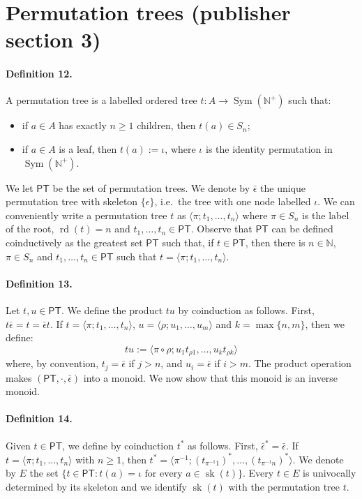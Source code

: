 \section*{Permutation trees (publisher section 3)}
\paragraph{Definition 12.} A permutation tree is a labelled ordered tree $t:A\to\operatorname{Sym}(\mathbb N^+)$ such that:
\begin{itemize}
\item if $a\in A$ has exactly $n\ge1$ children, then $t(a)\in S_n$;
\item if $a\in A$ is a leaf, then $t(a):=\iota$, where $\iota$ is the identity permutation in $\operatorname{Sym}(\mathbb N^+)$.
\end{itemize}
We let $\mathsf{PT}$ be the set of permutation trees.
We denote by $\bar\epsilon$ the unique permutation tree with skeleton $\{\epsilon\}$, i.e.\ the tree with one node labelled $\iota$.
We can conveniently write a permutation tree $t$ as $\langle\pi;t_1,\ldots,t_n\rangle$ where $\pi\in S_n$ is the label of the root, $\operatorname{rd}(t)=n$ and $t_1,\ldots,t_n\in\mathsf{PT}$.
Observe that $\mathsf{PT}$ can be defined coinductively as the greatest set $\mathsf{PT}$ such that, if $t\in\mathsf{PT}$, then there is $n\in\mathbb N$, $\pi\in S_n$ and $t_1,\ldots,t_n\in\mathsf{PT}$ such that $t=\langle\pi;t_1,\ldots,t_n\rangle$.
\paragraph{Definition 13.} Let $t,u\in\mathsf{PT}$. We define the product $tu$ by coinduction as follows. First, $t\bar\epsilon=t=\bar\epsilon t$.
If $t=\langle\pi;t_1,\ldots,t_n\rangle$, $u=\langle\rho;u_1,\ldots,u_m\rangle$ and $k=\max\{n,m\}$, then we define:
\[
tu:=\langle\pi\circ\rho;u_1t_{\rho1},\ldots,u_kt_{\rho k}\rangle
\]
where, by convention, $t_j=\bar\epsilon$ if $j>n$, and $u_i=\bar\epsilon$ if $i>m$.
The product operation makes $(\mathsf{PT},\cdot,\bar\epsilon)$ into a monoid. We now show that this monoid is an inverse monoid.
\paragraph{Definition 14.} Given $t\in\mathsf{PT}$, we define by coinduction $t^*$ as follows. First, $\bar\epsilon^*=\bar\epsilon$.
If $t=\langle\pi;t_1,\ldots,t_n\rangle$ with $n\ge1$, then $t^*=\langle\pi^{-1};(t_{\pi^{-1}1})^*,\ldots,(t_{\pi^{-1}n})^*\rangle$.
We denote by $E$ the set $\{t\in\mathsf{PT}:t(a)=\iota\text{ for every }a\in\operatorname{sk}(t)\}$.
Every $t\in E$ is univocally determined by its skeleton and we identify $\operatorname{sk}(t)$ with the permutation tree $t$.
